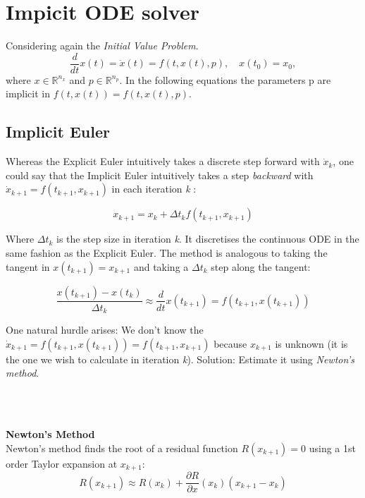 \section{Impicit ODE solver}
Considering again the \textit{Initial Value Problem}.
$$
\frac{d}{d t} x(t)= \dot{x}(t)=f(t, x(t), p), \quad x\left(t_{0}\right)=x_{0},
$$
where $x \in \mathbb{R}^{n_{x}}$ and $p \in \mathbb{R}^{n_{p}}$. In the following equations the parameters p are implicit in $f(t, x(t)) = f(t, x(t), p)$.

\subsection{Implicit Euler}
Whereas the Explicit Euler intuitively takes a discrete step forward with $\dot{x}_k$, one could say that the Implicit Euler intuitively takes a step \textit{backward} with $\dot{x}_{k+1} = f(t_{k+1}, x_{k+1})$ in each iteration \textit{k} \cite{JrgensenScientificEquationsb}:

\begin{equation}
    x_{k+1}=x_{k}+\Delta t_k f\left(t_{k+1}, x_{k+1}\right)
\end{equation}

Where $\Delta t_k$ is the step size in iteration \textit{k}. It discretises the continuous ODE in the same fashion as the Explicit Euler. The method is analogous to taking the tangent in $x(t_{k+1}) = x_{k+1}$ and taking a $\Delta t_k$ step along the tangent:

\begin{equation}
\frac{x\left(t_{k+1}\right)-x\left(t_{k}\right)}{\Delta t_{k}} \approx \frac{d}{d t} x\left(t_{k+1}\right)=f\left(t_{k+1}, x\left(t_{k+1}\right)\right)
\end{equation}

One natural hurdle arises: We don't know the $\dot{x}_{k+1} = f\left(t_{k+1}, x\left(t_{k+1}\right)\right) = f\left(t_{k+1}, x_{k+1}\right)$ because $x_{k+1}$ is unknown (it is the one we wish to calculate in iteration \textit{k}). Solution: Estimate it using \textit{Newton's method}.

\\\

\textbf{Newton's Method} \\
Newton's method finds the root of a residual function $R(x_{k+1})=0$ using a 1st order Taylor expansion at $x_{k+1}$:
\begin{equation}
    R(x_{k+1}) \approx R(x_k) + \frac{\partial R}{\partial x}\left(x_{k
    }\right)\left(x_{k+1} - x_{k}\right)
\end{equation}

